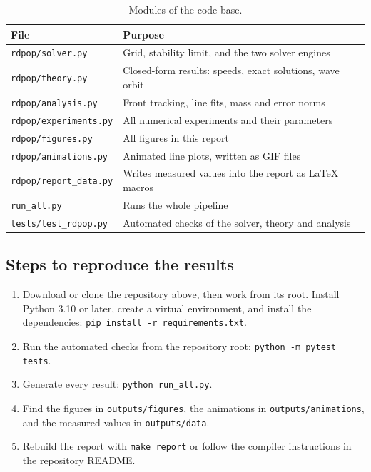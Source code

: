 \documentclass[11pt,a4paper]{article}
\newcommand{\code}[1]{\texttt{\small #1}}
\begin{document}
\begin{table}[H]
\centering\small
\caption{Modules of the code base.}
\label{tab:modules}
\begin{tabularx}{\textwidth}{lL}
\toprule
File & Purpose\\
\midrule
\code{rdpop/solver.py} & Grid, stability limit, and the two solver engines\\
\code{rdpop/theory.py} & Closed-form results: speeds, exact solutions, wave orbit\\
\code{rdpop/analysis.py} & Front tracking, line fits, mass and error norms\\
\code{rdpop/experiments.py} & All numerical experiments and their parameters\\
\code{rdpop/figures.py} & All figures in this report\\
\code{rdpop/animations.py} & Animated line plots, written as GIF files\\
\code{rdpop/report\_data.py} & Writes measured values into the report as LaTeX macros\\
\code{run\_all.py} & Runs the whole pipeline\\
\code{tests/test\_rdpop.py} & Automated checks of the solver, theory and analysis\\
\bottomrule
\end{tabularx}
\end{table}

\subsection{Steps to reproduce the results}
\begin{enumerate}
    \item Download or clone the repository above, then work from its root.
        Install Python 3.10 or later, create a virtual environment, and install the dependencies:
        \code{pip install -r requirements.txt}.
  \item Run the automated checks from the repository root: \code{python -m pytest tests}.
  \item Generate every result: \code{python run\_all.py}.
  \item Find the figures in \code{outputs/figures}, the animations in \code{outputs/animations}, and the
        measured values in \code{outputs/data}.
  \item Rebuild the report with \code{make report} or follow the compiler instructions
        in the repository README.
\end{enumerate}
\end{document}

